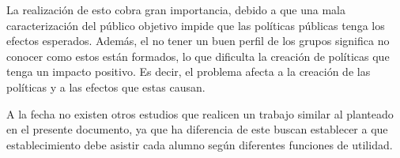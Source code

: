 La realización de esto cobra gran importancia, debido a que una mala caracterización del público objetivo impide que las políticas públicas tenga los efectos esperados. Además, el no tener un buen perfil de los grupos significa no conocer como estos están formados, lo que dificulta la creación de políticas que tenga un impacto positivo. Es decir, el problema afecta a la creación de las políticas y a las efectos que estas causan.

A la fecha no existen otros estudios que realicen un trabajo similar al planteado en el presente documento, ya que ha diferencia de este buscan establecer a que establecimiento debe asistir cada alumno según diferentes funciones de utilidad.